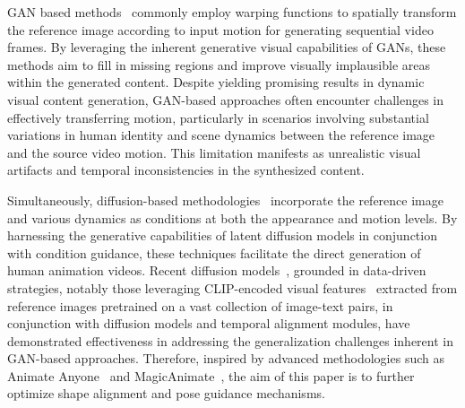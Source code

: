 GAN based methods~\cite{siarohin2019first,wang2021one,tian2021good,wang2020g3an, yoon2021poseguided, sarkar2021humangan} commonly employ warping functions to spatially transform the reference image according to input motion for generating sequential video frames. 
By leveraging the inherent generative visual capabilities of GANs, these methods aim to fill in missing regions and improve visually implausible areas within the generated content.
Despite yielding promising results in dynamic visual content generation, GAN-based approaches often encounter challenges in effectively transferring motion, particularly in scenarios involving substantial variations in human identity and scene dynamics between the reference image and the source video motion. 
This limitation manifests as unrealistic visual artifacts and temporal inconsistencies in the synthesized content.


Simultaneously, diffusion-based methodologies~\cite{guo2023animatediff,karras2023dreampose,wang2023disco,karras2023dreampose,zhang2023magicavatar} incorporate the reference image and various dynamics as conditions at both the appearance and motion levels.
By harnessing the generative capabilities of latent diffusion models in conjunction with condition guidance, these techniques facilitate the direct generation of human animation videos. 
Recent diffusion models~\cite{karras2023dreampose,wang2023disco}, grounded in data-driven strategies, notably those leveraging CLIP-encoded visual features~\cite{radford2021learning} extracted from reference images pretrained on a vast collection of image-text pairs, in conjunction with diffusion models and temporal alignment modules, have demonstrated effectiveness in addressing the generalization challenges inherent in GAN-based approaches.
Therefore, inspired by advanced methodologies such as Animate Anyone~\cite{hu2023animate} and MagicAnimate~\cite{xu2023magicanimate}, the aim of this paper is to further optimize shape alignment and pose guidance mechanisms. 



